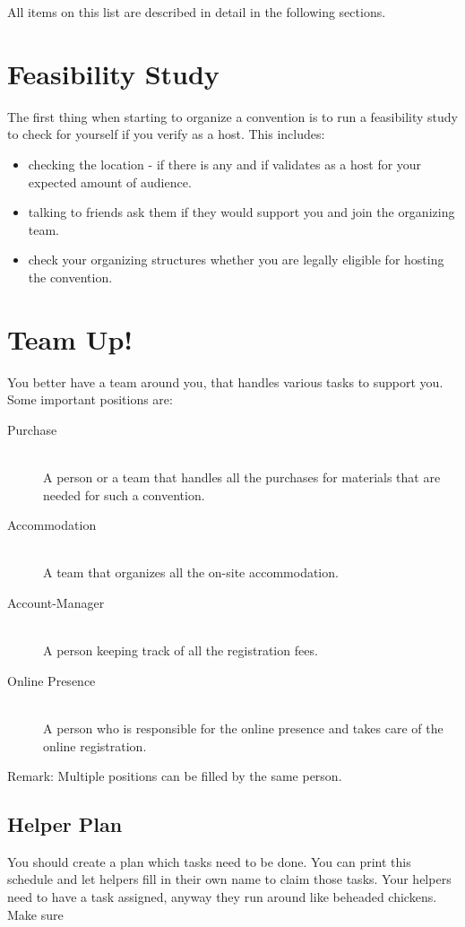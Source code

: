 \documentclass[11pt]{report}
\begin{document}
All items on this list are described in detail in the following sections.

\section{Feasibility Study}

The first thing when starting to organize a convention is to run a feasibility 
study to check for yourself if you verify as a host. This includes:

\begin{itemize}
	\item checking the location - if there is any and if validates as a host for 
	your expected amount of audience.
	\item talking to friends ask them if they would support you and join the 
	organizing team.
	\item check your organizing structures whether you are legally eligible for 
	hosting the convention.
\end{itemize}

\section{Team Up!}

You better have a team around you, that handles various tasks to support you. 
Some important positions are:

\begin{description}
	\item [Purchase] \hfill \\
	A person or a team that handles all the purchases for materials that are needed 
	for such a convention.
	\item [Accommodation] \hfill \\
	A team that organizes all the on-site accommodation.
	\item [Account-Manager] \hfill \\
	A person keeping track of all the registration fees.
	\item [Online Presence] \hfill \\
	A person who is responsible for the online presence and takes care of the 
	online registration.
\end{description}
Remark: Multiple positions can be filled by the same person.

\subsection{Helper Plan}
You should create a plan which tasks need to be done. You can print this 
schedule and let helpers fill in their own name to claim those tasks. Your 
helpers need to have a task assigned, anyway they run around like beheaded 
chickens. Make sure 
\end{document}
